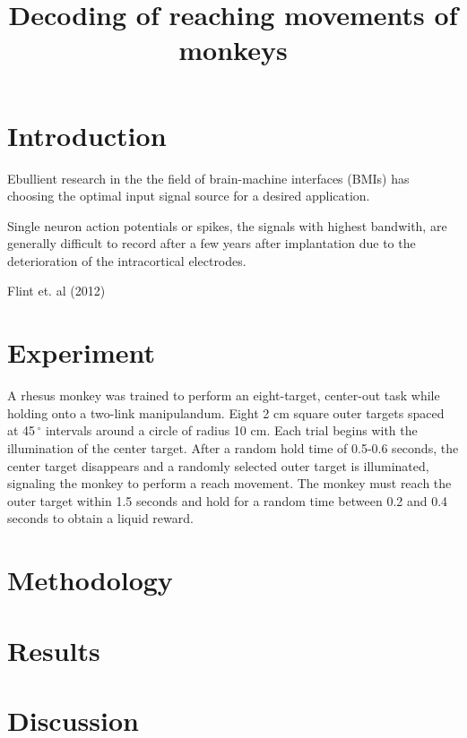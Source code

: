 \documentclass{article}
\begin{document}
\title{Decoding of reaching movements of monkeys}
\maketitle


\section{Introduction}

Ebullient research in the the field of brain-machine interfaces (BMIs) has 
choosing the optimal input signal source for a desired application.  

Single neuron action potentials or spikes, the signals with highest bandwith, are generally difficult to record after a few years after implantation due to the deterioration of the intracortical electrodes.  




Flint et. al (2012) 



\section{Experiment}
A rhesus monkey was trained to perform an eight-target, center-out task while holding onto a two-link manipulandum.  Eight 2 cm square outer targets spaced at 45$\,^{\circ}$ intervals around a circle of radius 10 cm.  Each trial begins with the illumination of the center target.  After a random hold time of 0.5-0.6 seconds, the center target disappears and a randomly selected outer target is illuminated, signaling the monkey to perform a reach movement.  The monkey must reach the outer target within 1.5 seconds and hold for a random time between 0.2 and 0.4 seconds to obtain a liquid reward.  

\section{Methodology}


\section{Results}

\section{Discussion}
\end{document}
